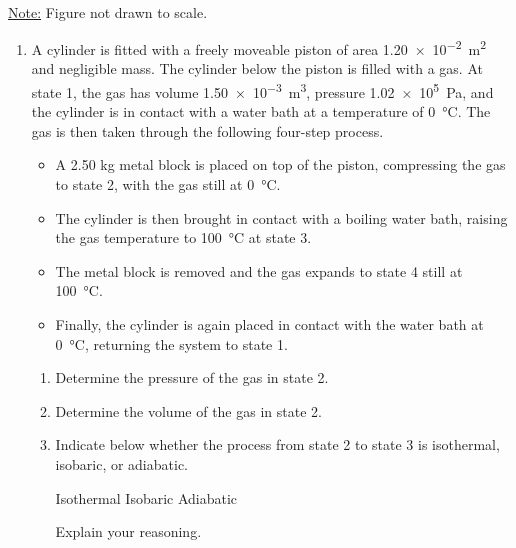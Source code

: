 \documentclass{../../../oss-apphys}
\begin{document}
\begin{center}
  \\
  \underline{Note:} Figure not drawn to scale.
\end{center}
\begin{enumerate}[leftmargin=15pt]
\item A cylinder is fitted with a freely moveable piston of area
  \SI{1.20e-2}{\metre^2} and negligible mass. The cylinder below the piston is
  filled with a gas. At state 1, the gas has volume \SI{1.50e-3}{\metre^3},
  pressure \SI{1.02e5}{\pascal}, and the cylinder is in contact with a water
  bath at a temperature of \SI{0}{\celsius}. The gas is then taken through the
  following four-step process.
  \begin{itemize}
  \item A 2.50 kg metal block is placed on top of the piston, compressing the
    gas to state 2, with the gas still at \SI{0}{\celsius}.
  \item The cylinder is then brought in contact with a boiling water bath,
    raising the gas temperature to \SI{100}{\celsius} at state 3.
  \item The metal block is removed and the gas expands to state 4 still at
    \SI{100}{\celsius}.
  \item Finally, the cylinder is again placed in contact with the water bath at
    \SI{0}{\celsius}, returning the system to state 1.
  \end{itemize}
  \begin{enumerate}[leftmargin=18pt]
  \item Determine the pressure of the gas in state 2.
  \item Determine the volume of the gas in state 2.
  \item Indicate below whether the process from state 2 to state 3 is
    isothermal, isobaric, or adiabatic.

    \vspace{.1in}
    \underline{\hspace{.3in}} Isothermal\hspace{.5in}
    \underline{\hspace{.3in}} Isobaric\hspace{.5in}
    \underline{\hspace{.3in}} Adiabatic
    
    \vspace{.1in}Explain your reasoning.\vspace{.35in}
    \newpage
    

\end{enumerate}
\end{enumerate}
\end{document}
